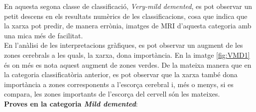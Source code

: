 \documentclass[a4paper,12pt]{article}
\begin{document}
En aquesta segona classe de classificació, \textit{Very-mild demented}, es pot observar un petit descens en els resultats numèrics de les classificacions, cosa que indica que la xarxa pot predir, de manera errònia, imatges de MRI d'aquesta categoria amb una mica més de facilitat.\\
En l'anàlisi de les interpretacions gràfiques, es pot observar un augment de les zones cerebrals a les quals, la xarxa, dona importància. En la imatge \ref{fig:VMD1} és on més es nota aquest augment de zones verdes. De la mateixa manera que en la categoria classificatòria anterior, es pot observar que la xarxa també dona importància a zones corresponents a l'escorça cerebral i, més o menys, si es compara, les zones importants de l'escorça del cervell són les mateixes.\\
\textbf{Proves en la categoria \textit{Mild demented}}:
\end{document}
